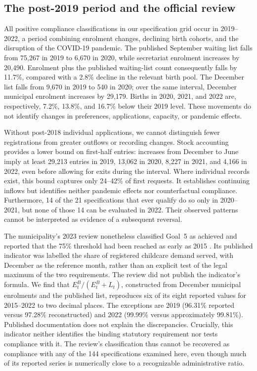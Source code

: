 \subsection{The post-2019 period and the official review}\label{sec:pandemic}

All positive compliance classifications in our specification grid occur in 2019--2022, a period combining enrolment changes, declining birth cohorts, and the disruption of the COVID-19 pandemic. The published September waiting list falls from 75,267 in 2019 to 6,670 in 2020, while secretariat enrolment increases by 20,490. Enrolment plus the published waiting-list count consequently falls by 11.7\%, compared with a 2.8\% decline in the relevant birth pool. The December list falls from 9,670 in 2019 to 540 in 2020; over the same interval, December municipal enrolment increases by 29,179. Births in 2020, 2021, and 2022 are, respectively, 7.2\%, 13.8\%, and 16.7\% below their 2019 level. These movements do not identify changes in preferences, applications, capacity, or pandemic effects.

Without post-2018 individual applications, we cannot distinguish fewer registrations from greater outflows or recording changes. Stock accounting provides a lower bound on first-half entries: increases from December to June imply at least 29,213 entries in 2019, 13,062 in 2020, 8,227 in 2021, and 4,166 in 2022, even before allowing for exits during the interval. Where individual records exist, this bound captures only 24--42\% of first requests. It establishes continuing inflows but identifies neither pandemic effects nor counterfactual compliance. Furthermore, 14 of the 21 specifications that ever qualify do so only in 2020--2021, but none of those 14 can be evaluated in 2022. Their observed patterns cannot be interpreted as evidence of a subsequent reversal.

The municipality's 2023 review nonetheless classified Goal~5 as achieved and reported that the 75\% threshold had been reached as early as 2015 \citep{saopaulo2023conferencia}. Its published indicator was labelled the share of registered childcare demand served, with December as the reference month, rather than an explicit test of the legal maximum of the two requirements. The review did not publish the indicator's formula. We find that $E^B_t/(E^B_t+L_t)$, constructed from December municipal enrolments and the published list, reproduces six of its eight reported values for 2015--2022 to two decimal places. The exceptions are 2019 (96.31\% reported versus 97.28\% reconstructed) and 2022 (99.99\% versus approximately 99.81\%). Published documentation does not explain the discrepancies. Crucially, this indicator neither identifies the binding statutory requirement nor tests compliance with it. The review's classification thus cannot be recovered as compliance with any of the 144 specifications examined here, even though much of its reported series is numerically close to a recognizable administrative ratio.

